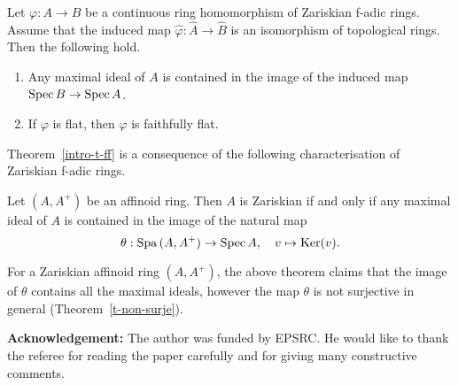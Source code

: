 \begin{thm}\label{intro-t-ff}
Let $\varphi:A \to B$ be a continuous ring homomorphism 
of Zariskian f-adic rings. 
Assume that the induced map $\widehat{\varphi}:\widehat{A} \to \widehat{B}$ 
is an isomorphism of topological rings. 
Then the following hold. 
\begin{enumerate}
\item 
Any maximal ideal of $A$ is contained in the image of 
the induced map ${\operatorname{Spec}}\,B \to {\operatorname{Spec}}\,A$. 
\item 
If $\varphi$ is flat, then $\varphi$ is faithfully flat. 
\end{enumerate}
\end{thm}


Theorem~\ref{intro-t-ff} is a consequence of 
the following characterisation of Zariskian f-adic rings. 


\begin{thm}
Let $(A, A^+)$ be an affinoid ring. 
Then $A$ is Zariskian if and only if 
any maximal ideal of $A$ is contained in the image of 
the natural map 
$$\theta:{\operatorname{Spa}}\,(A, A^+) \to {\operatorname{Spec}}\,A, \quad v \mapsto {\operatorname{Ker}}(v).$$
\end{thm}

For a Zariskian affinoid ring $(A, A^+)$, 
the above theorem claims that 
the image of $\theta$ contains all the maximal ideals, 
however the map $\theta$ 
is not surjective in general (Theorem~\ref{t-non-surje}). 


\medskip

\textbf{Acknowledgement:} 
The author was funded by EPSRC. 
He would like to thank the referee for reading the paper carefully and for giving many constructive comments. 